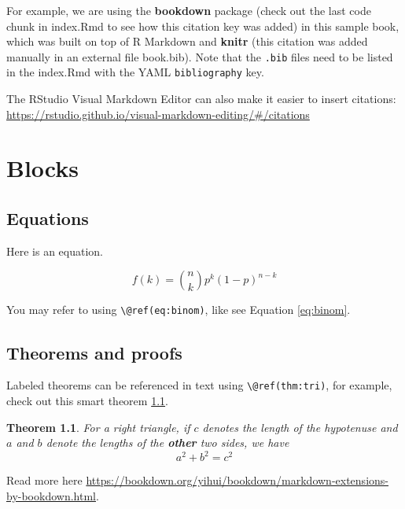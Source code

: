 \documentclass[
]{book}
\newtheorem{theorem}{Theorem}[chapter]
\theoremstyle{definition}
\theoremstyle{definition}
\theoremstyle{definition}
\theoremstyle{definition}
\theoremstyle{remark}
\begin{document}
For example, we are using the \textbf{bookdown} package \citep{R-bookdown} (check out the last code chunk in index.Rmd to see how this citation key was added) in this sample book, which was built on top of R Markdown and \textbf{knitr} \citep{xie2015} (this citation was added manually in an external file book.bib).
Note that the \texttt{.bib} files need to be listed in the index.Rmd with the YAML \texttt{bibliography} key.

The RStudio Visual Markdown Editor can also make it easier to insert citations: \url{https://rstudio.github.io/visual-markdown-editing/\#/citations}

\hypertarget{blocks}{%
\chapter{Blocks}\label{blocks}}

\hypertarget{equations}{%
\section{Equations}\label{equations}}

Here is an equation.

\begin{equation} 
  f\left(k\right) = \binom{n}{k} p^k\left(1-p\right)^{n-k}
  \label{eq:binom}
\end{equation}

You may refer to using \texttt{\textbackslash{}@ref(eq:binom)}, like see Equation \eqref{eq:binom}.

\hypertarget{theorems-and-proofs}{%
\section{Theorems and proofs}\label{theorems-and-proofs}}

Labeled theorems can be referenced in text using \texttt{\textbackslash{}@ref(thm:tri)}, for example, check out this smart theorem \ref{thm:tri}.

\begin{theorem}
\protect\hypertarget{thm:tri}{}\label{thm:tri}For a right triangle, if \(c\) denotes the \emph{length} of the hypotenuse
and \(a\) and \(b\) denote the lengths of the \textbf{other} two sides, we have
\[a^2 + b^2 = c^2\]
\end{theorem}

Read more here \url{https://bookdown.org/yihui/bookdown/markdown-extensions-by-bookdown.html}.
\end{document}
